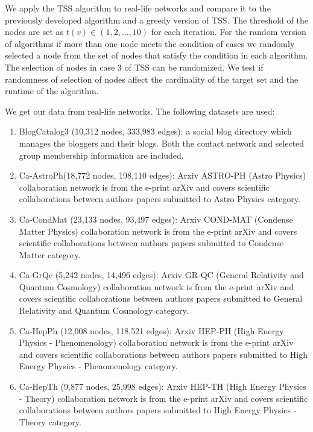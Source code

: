 We apply the TSS algorithm to real-life networks and compare it to the previously developed algorithm and a greedy version of TSS. The threshold of the nodes are set as $t(v)\in(1,2,...,10)$ for each iteration. For the random version of algorithms if more than one node meets the condition of cases we randomly selected a node from the set of nodes that satisfy the condition in each algorithm. The selection of nodes in case 3 of TSS can be randomized. We test if randomness of selection of nodes affect the cardinality of the target set and the runtime of the algorithm.

We get our data from real-life networks\cite{datasets1}\cite{datasets2}. The following datasets are used:
\begin{enumerate}
	\item BlogCatalog3 (10,312 nodes, 333,983 edges): a social blog directory which manages the bloggers and their blogs. Both the contact network and selected group membership information are included.
	\item Ca-AstroPh(18,772 nodes, 198,110 edges): Arxiv ASTRO-PH (Astro Physics) collaboration network is from the e-print arXiv and covers scientific collaborations between authors papers submitted to Astro Physics category.
	\item Ca-CondMat (23,133 nodes, 93,497 edges): Arxiv COND-MAT (Condense Matter Physics) collaboration network is from the e-print arXiv and covers scientific collaborations between authors papers submitted to Condense Matter category.
	\item Ca-GrQc (5,242 nodes, 14,496 edges): Arxiv GR-QC (General Relativity and Quantum Cosmology) collaboration network is from the e-print arXiv and covers scientific collaborations between authors papers submitted to General Relativity and Quantum Cosmology category. 
	\item Ca-HepPh (12,008 nodes, 118,521 edges): Arxiv HEP-PH (High Energy Physics - Phenomenology) collaboration network is from the e-print arXiv and covers scientific collaborations between authors papers submitted to High Energy Physics - Phenomenology category.
	\item Ca-HepTh (9,877 nodes, 25,998 edges): Arxiv HEP-TH (High Energy Physics - Theory) collaboration network is from the e-print arXiv and covers scientific collaborations between authors papers submitted to High Energy Physics - Theory category. 
\end{enumerate}

